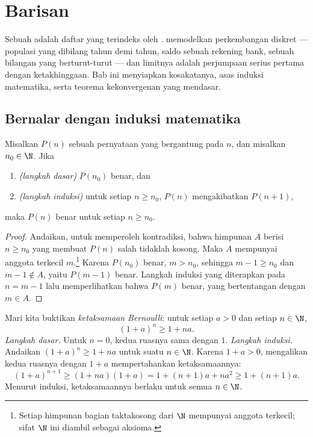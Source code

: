 \chapter{Barisan}\label{ch:g12:seq}

Sebuah  adalah daftar  yang terindeks oleh .
 memodelkan perkembangan diskret --- populasi yang dibilang tahun demi
tahun, saldo sebuah rekening bank,  sebuah bilangan yang berturut-turut
--- dan limitnya adalah perjumpaan serius pertama dengan ketakhinggaan. Bab ini
menyiapkan kosakatanya, asas induksi matematika, serta teorema kekonvergenan
yang mendasar.

\section{Bernalar dengan induksi matematika}

\begin{theorem}\label{thm:g12:seq:induction}
Misalkan $P(n)$ sebuah pernyataan yang bergantung pada  $n$, dan
misalkan $n_0 \in \N$. Jika
\begin{enumerate}
  \item \emph{(langkah dasar)} $P(n_0)$ benar, dan
  \item \emph{(langkah induksi)} untuk setiap $n \geq n_0$, $P(n)$ mengakibatkan $P(n+1)$,
\end{enumerate}
maka $P(n)$ benar untuk setiap $n \geq n_0$.
\end{theorem}

\begin{proof}
Andaikan, untuk memperoleh kontradiksi, bahwa himpunan $A$ berisi 
$n \geq n_0$ yang membuat $P(n)$ salah tidaklah kosong. Maka $A$ mempunyai
anggota terkecil $m$.\footnote{Setiap himpunan bagian taktakosong dari $\N$
mempunyai anggota terkecil; sifat $\N$ ini diambil sebagai aksioma.} Karena
$P(n_0)$ benar, $m > n_0$, sehingga $m - 1 \geq n_0$ dan $m-1 \notin A$, yaitu
$P(m-1)$ benar. Langkah induksi yang diterapkan pada $n = m-1$ lalu
memperlihatkan bahwa $P(m)$ benar, yang bertentangan dengan $m \in A$.
\end{proof}

\begin{example}\label{ex:g12:seq:bernoulli}
Mari kita buktikan \emph{ketaksamaan Bernoulli}: untuk setiap 
$a > 0$ dan setiap $n \in \N$,
\[
(1+a)^n \geq 1 + na.
\]
\emph{Langkah dasar.} Untuk $n = 0$, kedua ruasnya sama dengan $1$.
\emph{Langkah induksi.} Andaikan $(1+a)^n \geq 1+na$ untuk suatu $n \in \N$.
Karena $1 + a > 0$, mengalikan kedua ruasnya dengan $1+a$ mempertahankan ketaksamaannya:
\[
(1+a)^{n+1} \geq (1+na)(1+a) = 1 + (n+1)a + na^2 \geq 1 + (n+1)a .
\]
Menurut induksi, ketaksamaannya berlaku untuk semua $n \in \N$.
\end{example}

